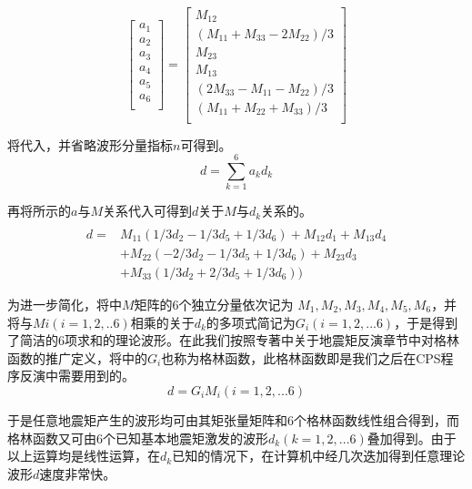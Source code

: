\begin{equation}
\label{eq2_05}
\left[\begin{array}{c}
a_1\\
a_2\\
a_3\\
a_4\\
a_5\\
a_6\\
\end{array}\right]=
\left[\begin{array}{c}
M_{12}\\
(M_{11}+M_{33}-2M_{22})/3\\
M_{23}\\
M_{13}\\
(2M_{33}-M_{11}-M_{22})/3\\
(M_{11}+M_{22}+M_{33})/3\\
\end{array}\right]
\end{equation}

将代入，并省略波形分量指标$n$可得到。
\begin{equation}
\label{eq2_06}
d=\sum_{k=1}^{6}a_kd_k
\end{equation}

再将所示的$a$与$M$关系代入可得到$d$关于$M$与$d_k$关系的。
\begin{equation}
\label{eq2_07}
\begin{array}{rl}\\
d=&M_{11}(1/3d_2-1/3d_5+1/3d_6)+M_{12}d_1+M_{13}d_4\\
&+M_{22}(-2/3d_2-1/3d_5+1/3d_6)+M_{23}d_3\\
&+M_{33}(1/3d_2+2/3d_5+1/3d_6))
\end{array}
\end{equation}

为进一步简化，将中$M$矩阵的6个独立分量依次记为 $M_1,M_2,M_3,M_4,M_5,M_6$，并将与$Mi(i=1,2,..6)$相乘的关于$d_k$的多项式简记为$G_i(i=1,2,...6)$，于是得到了简洁的6项求和的理论波形。在此我们按照\citet{Stein2003}专著中关于地震矩反演章节中对格林函数的推广定义，将中的$G_i$也称为格林函数，此格林函数即是我们之后在CPS程序反演中需要用到的。
\begin{equation}
\label{eq2_08}
d=G_iM_i(i=1,2,...6)
\end{equation}

于是任意地震矩产生的波形均可由其矩张量矩阵和6个格林函数线性组合得到，而格林函数又可由6个已知基本地震矩激发的波形$d_k(k=1,2,...6)$叠加得到。由于以上运算均是线性运算，在$d_k$已知的情况下，在计算机中经几次迭加得到任意理论波形$d$速度非常快。

